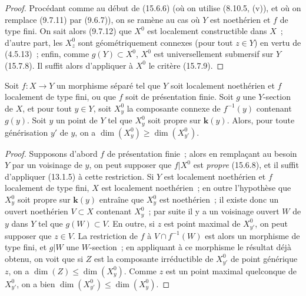 \begin{proof}
Procédant comme au début de (15.6.6) (où on utilise (8.10.5, (v)), et où on remplace (9.7.11) par (9.6.7)), on se ramène au cas où $Y$ est noethérien et $f$ de type fini. On sait alors (9.7.12) que $X^0$ est localement constructible dans $X$~; d'autre part, les $X_z^0$ sont géométriquement connexes (pour tout $z\in Y$) en vertu de (4.5.13)~; enfin, comme $g(Y)\subset X^0$, $X^0$ est universellement submersif sur $Y$ (15.7.8). Il suffit alors d'appliquer à $X^0$ le critère (15.7.9).
\end{proof}

\begin{corollary}[15.6.9]
\label{IV.15.6.9-fr}
Soit $f:X\to Y$ un morphisme séparé tel que $Y$ soit localement noethérien et $f$ localement de type fini, \textup{ou} que $f$ soit de présentation finie. Soit $g$ une $Y$-section de $X$, et pour tout $y\in Y$, soit $X_y^0$ la composante connexe de $f^{-1}(y)$ contenant $g(y)$. Soit $y$ un point de $Y$ tel que $X_y^0$ soit propre sur $\boldsymbol{k}(y)$. Alors, pour toute générisation $y'$ de $y$, on a $\dim(X_y^0)\geqslant\dim(X_{y'}^0)$.
\end{corollary}

\begin{proof}
Supposons d'abord $f$ de présentation finie~; alors en remplaçant au besoin $Y$ par un voisinage de $y$, on peut supposer que $f|X^0$ est \emph{propre} (15.6.8), et il suffit d'appliquer (13.1.5) à cette restriction. Si $Y$ est localement noethérien et $f$ localement de type fini, $X$ est localement noethérien~; en outre l'hypothèse que $X_y^0$ soit propre sur $\boldsymbol{k}(y)$ entraîne que $X_y^0$ est noethérien~; il existe donc un ouvert noethérien $V\subset X$ contenant $X_y^0$~; par suite il y a un voisinage ouvert $W$ de $y$ dans $Y$ tel que $g(W)\subset V$. En outre, si $z$ est point maximal de $X_{y'}^0$, on peut supposer que $z\in V$. La restriction de $f$ à $V\cap f^{-1}(W)$ est alors un morphisme de type fini, et $g|W$ une $W$-section~; en appliquant à ce morphisme le résultat déjà obtenu, on voit que si $Z$ est la composante irréductible de $X_{y'}^0$ de point générique $z$, on a $\dim(Z)\leqslant\dim(X_y^0)$. Comme $z$ est un point maximal quelconque de $X_{y'}^0$, on a bien $\dim(X_{y'}^0)\leqslant\dim(X_y^0)$.
\end{proof}

